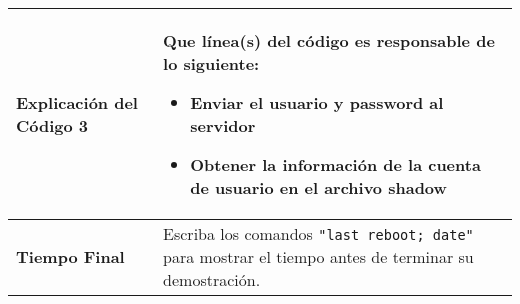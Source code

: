 \begin{longtable}{|p{}|p{}|}
 \textbf{Explicación del Código 3} & 
	Que línea(s) del código es responsable de lo siguiente:
	\vspace*{0.2cm}
 	\begin{itemize}[topsep=-0.5cm,leftmargin=0.4cm]
 		\item Enviar el usuario y password al servidor
 		\item Obtener la información de la cuenta de usuario en el archivo shadow
	\end{itemize}
 \\ 
 \hline

 \textbf{Tiempo Final} & 
	Escriba los comandos \texttt{"last reboot; date"} para mostrar el tiempo antes de terminar su demostración.
 \\ 
 \hline

\end{longtable}
